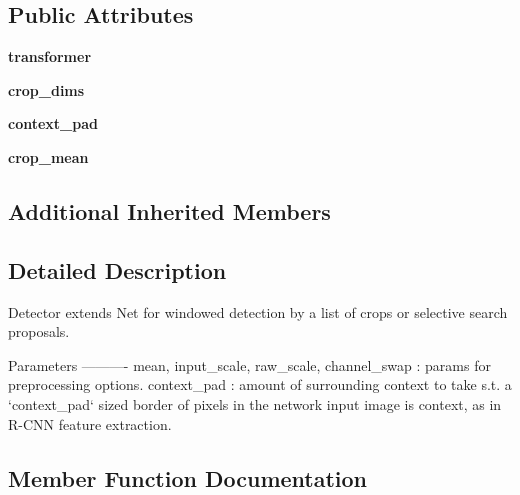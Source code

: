 \subsection*{Public Attributes}
\begin{DoxyCompactItemize}
\item 
\mbox{\label{classcaffe_1_1detector_1_1_detector_a6ab029f8b9627cd96f11b935e263549f}} 
{\bfseries transformer}
\item 
\mbox{\label{classcaffe_1_1detector_1_1_detector_a6e914f9d5071a3d5a41f7542f216e6d9}} 
{\bfseries crop\+\_\+dims}
\item 
\mbox{\label{classcaffe_1_1detector_1_1_detector_a25b10b7dedec3c75c589cfbffa1271af}} 
{\bfseries context\+\_\+pad}
\item 
\mbox{\label{classcaffe_1_1detector_1_1_detector_a2caeb79b367cfca8577c4fddc53ac956}} 
{\bfseries crop\+\_\+mean}
\end{DoxyCompactItemize}
\subsection*{Additional Inherited Members}


\subsection{Detailed Description}
\begin{DoxyVerb}Detector extends Net for windowed detection by a list of crops or
selective search proposals.

Parameters
----------
mean, input_scale, raw_scale, channel_swap : params for preprocessing
    options.
context_pad : amount of surrounding context to take s.t. a `context_pad`
    sized border of pixels in the network input image is context, as in
    R-CNN feature extraction.
\end{DoxyVerb}
 

\subsection{Member Function Documentation}
\mbox{\label{classcaffe_1_1detector_1_1_detector_a3706bb8bcd04387c065f7bb6b34f4875}} 

